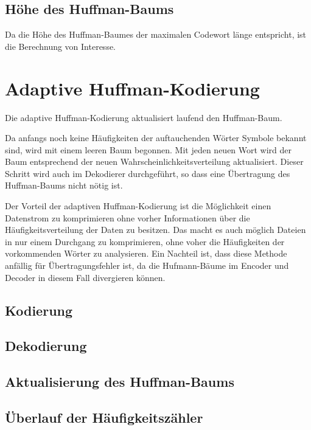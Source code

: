 \documentclass[twoside,11pt,a4paper]{article}
\theoremstyle{break}
\begin{document}
\subsection{Höhe des Huffman-Baums}

Da die Höhe des Huffman-Baumes der maximalen Codewort länge
entspricht, ist die Berechnung von Interesse.

\section{Adaptive Huffman-Kodierung}

Die adaptive Huffman-Kodierung aktualisiert laufend den Huffman-Baum.

Da anfangs noch keine Häufigkeiten der auftauchenden Wörter Symbole
bekannt sind, wird mit einem leeren Baum begonnen. Mit jeden neuen
Wort wird der Baum entsprechend der neuen
Wahrscheinlichkeitsverteilung aktualisiert. Dieser Schritt wird auch
im Dekodierer durchgeführt, so dass eine Übertragung des Huffman-Baums
nicht nötig ist.

Der Vorteil der adaptiven Huffman-Kodierung ist die Möglichkeit einen
Datenstrom zu komprimieren ohne vorher Informationen über die
Häufigkeitsverteilung der Daten zu besitzen. Das macht es auch möglich
Dateien in nur einem Durchgang zu komprimieren, ohne voher die
Häufigkeiten der vorkommenden Wörter zu analysieren. Ein Nachteil ist,
dass diese Methode anfällig für Übertragungsfehler ist, da die
Hufmann-Bäume im Encoder und Decoder in diesem Fall divergieren
können.

\subsection{Kodierung}

\subsection{Dekodierung}

\subsection{Aktualisierung des Huffman-Baums}


\subsection{Überlauf der Häufigkeitszähler}
\end{document}
